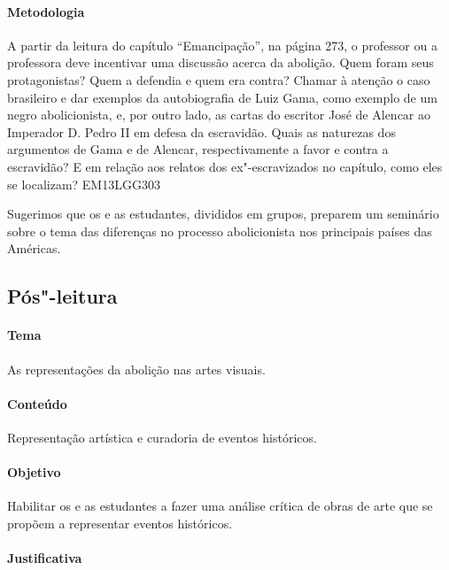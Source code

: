 \documentclass[11pt]{extarticle}
\begin{document}
\paragraph{Metodologia} A partir da leitura do capítulo ``Emancipação'', na página 273, 
o professor ou a professora deve incentivar uma discussão acerca da abolição. 
Quem foram seus protagonistas? Quem a defendia e quem era contra? 
Chamar à atenção o caso brasileiro e dar exemplos da autobiografia de Luiz Gama,
como exemplo de um negro abolicionista, e, por outro lado, as cartas do escritor 
José de Alencar ao Imperador D. Pedro II em defesa da escravidão. 
Quais as naturezas dos argumentos de Gama e de Alencar, respectivamente a 
favor e contra a escravidão? E em relação aos relatos dos ex"-escravizados no capítulo, 
como eles se localizam?
EM13LGG303 %

Sugerimos que os e as estudantes, divididos em grupos, preparem um seminário sobre o tema
das diferenças no processo abolicionista nos principais países das Américas. 


\subsection{Pós"-leitura}

\paragraph{Tema} As representações da abolição nas artes visuais.

\paragraph{Conteúdo} Representação artística e curadoria de eventos históricos.

\paragraph{Objetivo} Habilitar os e as estudantes a fazer uma análise
crítica de obras de arte que se propõem a representar eventos históricos.

\paragraph{Justificativa} 
\end{document}

